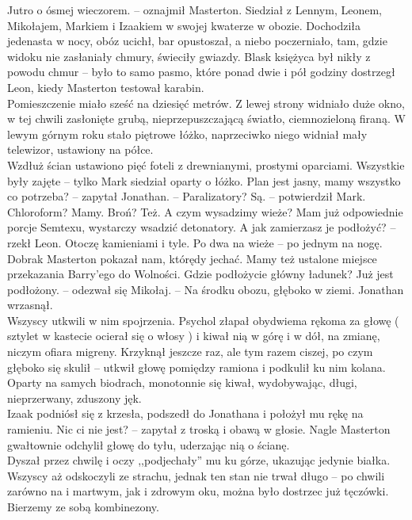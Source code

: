 \documentclass[../MAIN.tex]{subfiles}
\begin{document}
\sx Jutro o ósmej wieczorem. -- oznajmił Masterton.
\qd
Siedział z Lennym, Leonem, Mikołajem, Markiem i Izaakiem w swojej kwaterze w obozie. Dochodziła jedenasta w nocy, obóz ucichł, bar opustoszał, a niebo poczerniało, tam, gdzie widoku nie zasłaniały chmury, świeciły gwiazdy. Blask księżyca był nikły z powodu chmur -- było to samo pasmo, które ponad dwie i pół godziny dostrzegł Leon, kiedy Masterton testował karabin. \\
Pomieszczenie miało sześć na dziesięć metrów. Z lewej strony widniało duże okno, w tej chwili zasłonięte grubą, nieprzepuszczającą światło, ciemnozieloną firaną. W lewym górnym roku stało piętrowe łóżko, naprzeciwko niego widniał mały telewizor, ustawiony na półce. \\
Wzdłuż ścian ustawiono pięć foteli z drewnianymi, prostymi oparciami. Wszystkie były zajęte -- tylko Mark siedział oparty o łóżko.
\sx Plan jest jasny, mamy wszystko co potrzeba? -- zapytał Jonathan. -- Paralizatory?
\xx Są. -- potwierdził Mark.
\xx Chloroform?
\xx Mamy.
\xx Broń?
\xx Też.
\xx A czym wysadzimy wieże?
\xx Mam już odpowiednie porcje Semtexu, wystarczy wsadzić detonatory.
\xx A jak zamierzasz je podłożyć? -- rzekł Leon.
\xx Otoczę kamieniami i tyle. Po dwa na wieże -- po jednym na nogę.
\xx Dobra\3k Masterton pokazał nam, którędy jechać. Mamy też ustalone miejsce przekazania Barry’ego do Wolności. Gdzie podłożycie główny ładunek?
\xx Już jest podłożony. -- odezwał się Mikołaj. -- Na środku obozu, głęboko w ziemi.
\qd
Jonathan wrzasnął. \\
Wszyscy utkwili w nim spojrzenia. Psychol złapał obydwiema rękoma za głowę ( sztylet w kastecie ocierał się o włosy ) i kiwał nią w górę i w dół, na zmianę, niczym ofiara migreny. Krzyknął jeszcze raz, ale tym razem ciszej, po czym głęboko się skulił -- utkwił głowę pomiędzy ramiona i podkulił ku nim kolana. Oparty na samych biodrach, monotonnie się kiwał, wydobywając, długi, nieprzerwany, zduszony jęk. \\
Izaak podniósł się z krzesła, podszedł do Jonathana i położył mu rękę na ramieniu.
\sx Nic ci nie jest? -- zapytał z troską i obawą w głosie.
\qd
Nagle Masterton gwałtownie odchylił głowę do tyłu, uderzając nią o ścianę. \\
Dyszał przez chwilę i oczy ,,podjechały'' mu ku górze, ukazując jedynie białka.\\
Wszyscy aż odskoczyli ze strachu, jednak ten stan nie trwał długo -- po chwili zarówno na i martwym, jak i zdrowym oku, można było dostrzec już tęczówki.
%
\sx Bierzemy ze sobą kombinezony.
\end{document}
